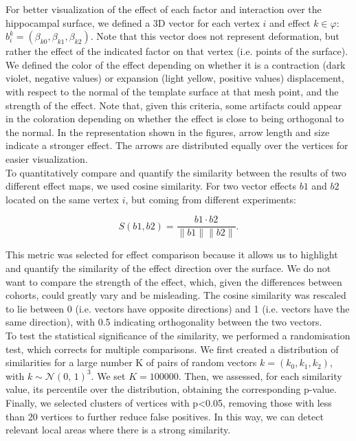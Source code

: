 For better visualization of the effect of each factor and interaction over the hippocampal surface, we defined a 3D vector for each vertex $i$ and effect $k \in \mathcal{\varphi}$: $b^k_{i} = (\beta_{k0}, \beta_{k1}, \beta_{k2}). $ Note that this vector does not represent deformation, but rather the effect of the indicated factor on that vertex (i.e. points of the surface). We defined the color of the effect depending on whether it is a contraction (dark violet, negative values) or expansion (light yellow, positive values) displacement, with respect to the normal of the template surface at that mesh point, and the strength of the effect. Note that, given this criteria, some artifacts could appear in the coloration depending on whether the effect is close to being orthogonal to the normal. In the representation shown in the figures, arrow length and size indicate a stronger effect. The arrows are distributed equally over the vertices for easier visualization.  \\

To quantitatively compare and quantify the similarity between the results of two different effect maps, we used cosine similarity. For two vector effects $b1$ and $b2$ located on the same vertex $i$,  but coming from different experiments:

\begin{equation}
S(b1, b2) = \frac{b1\cdot b2}{\|b1\|\|b2\|}.
\end{equation}

This metric was selected for effect comparison because it allows us to highlight and quantify the similarity of the effect direction over the surface. We do not want to compare the strength of the effect, which, given the differences between cohorts, could greatly vary and be misleading. The cosine similarity was rescaled to lie between 0 (i.e. vectors have opposite directions) and 1 (i.e. vectors have the same direction), with 0.5 indicating orthogonality between the two vectors. \\

To test the statistical significance of the similarity, we performed a randomisation test, which corrects for multiple comparisons. We first created a distribution of similarities for a large number K of pairs of random vectors $k = (k_0, k_1, k_2)$, with $k \sim \mathcal{N}(0,\,1)^3$. We set $K=100000$. Then, we assessed, for each similarity value, its percentile over the distribution, obtaining the corresponding p-value. Finally, we selected clusters of vertices with p<0.05, removing those with less than 20 vertices to further reduce false positives. In this way, we can detect relevant local areas where there is a strong similarity. \\

